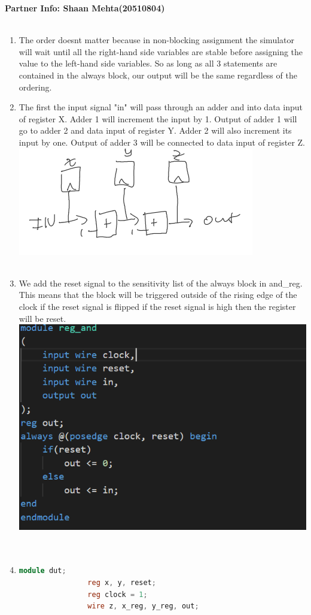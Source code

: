 \documentclass{report}
\begin{document}
	\textbf{Partner Info: Shaan Mehta(20510804)}\\\\
	\begin{enumerate}
		\item{The order doesnt matter because in non-blocking assignment the simulator will wait until all the right-hand side variables are stable before assigning the value to the left-hand side variables. So as long as all 3 statements are contained in the always block, our output will be the same regardless of the ordering.}
	
		\item{
			The first the input signal "in" will pass through an adder and into data input of register X. Adder 1 will increment the input by 1. Output of adder 1 will go to adder 2 and data input of register Y. Adder 2 will also increment its input by one. Output of adder 3 will be connected to data input of register Z.\\
			\includegraphics[scale=0.5]{hw_diag}\\\\
		}
		
		\item{
			We add the reset signal to the sensitivity list of the always block in and\_reg. This means that the block will be triggered outside of the rising edge of the clock if the reset signal is flipped if the reset signal is high then the register will be reset.\\
			\includegraphics[scale=0.5]{async_reset}\\\\
		}
		\pagebreak\\
		\item{
			\begin{lstlisting}[language=verilog]
				module dut;
				reg x, y, reset;
				reg clock = 1;
				wire z, x_reg, y_reg, out;
				

\end{lstlisting}}
\end{enumerate}
\end{document}
